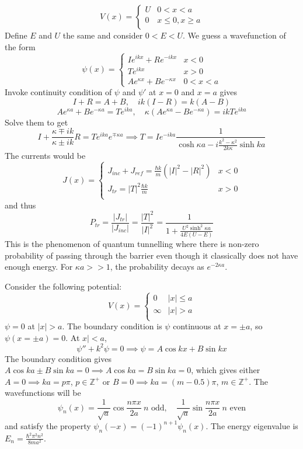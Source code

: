 \documentclass[a4paper]{article}
\begin{document}
\begin{eg}
   $$
V(x)=
\left\{
        \begin{array}{ll}
      U & 0<x<a\\
	0& x\leq 0,x\geq a\\
        \end{array}
    \right.
$$
Define $E$ and $U$ the same and consider $0<E<U$. We guess a wavefunction of the form
       $$
\psi(x)=
\left\{
        \begin{array}{ll}
      Ie^{ikx}+Re^{-ikx} & x<0\\
 Te^{ikx}& x>0\\
 Ae^{\kappa x}+Be^{-\kappa x}&0<x<a
        \end{array}
    \right.
$$
Invoke continuity condition of $\psi$ and $\psi'$ at $x=0$ and $x=a$ gives
$$I+R=A+B,\quad ik(I-R)=k(A-B)$$
$$Ae^{\kappa a}+Be^{-\kappa a}=Te^{ika},\quad \kappa (Ae^{\kappa a}-Be^{-\kappa a})=ikTe^{ika}$$
Solve them to get 
$$I+\frac{\kappa\mp ik}{\kappa\pm ik}R=Te^{ika}e^{\mp\kappa a}\implies T=Ie^{-ika}\frac{1}{\cosh\kappa a-i\frac{k^2-\kappa^2}{2k\kappa}\sinh ka}$$
The currents would be 
       $$
J(x)=
\left\{
        \begin{array}{ll}
      J_{inc}+J_{ref}=\frac{\hbar k}{m}(|I|^2-|R|^2)& x<0\\
J_{tr}=|T|^2\frac{\hbar k}{m}& x>0\\
        \end{array}
    \right.
$$
and thus 
$$P_{tr}=\frac{|J_{tr}|}{|J_{inc}|}=\frac{|T|^2}{|I|^2}=\frac{1}{1+\frac{U^2\sinh^2\kappa a}{4E(U-E)}}$$
This is the phenomenon of quantum tunnelling where there is non-zero probability of passing through the barrier even though it classically does not have enough energy. For $\kappa a>>1$, the probability decays as $e^{-2\kappa a}$.
\end{eg}
\begin{eg}
Consider the following potential:
    $$
V(x)=
\left\{
        \begin{array}{ll}
      0 & |x|\leq a \\
	\infty& |x|>a\\
        \end{array}
    \right.
$$
$\psi=0$ at $|x|>a$. The boundary condition is $\psi$ continuous at $x=\pm a$, so $\psi(x=\pm a)=0$. At $x|<a$, 
$$\psi''+k^2\psi=0\implies\psi=A\cos kx+B\sin kx$$
The boundary condition gives $A\cos ka\pm B\sin ka=0\implies A\cos ka=B\sin ka=0$, which gives either $A=0\implies ka=p\pi$, $p\in\mathbb{Z}^+$ or $B=0\implies ka=(m-0.5)\pi$, $m\in\mathbb{Z}^+$. The wavefunctions will be
$$\psi_n(x)=\frac{1}{\sqrt{a}}\cos\frac{n\pi x}{2a}~n\text{ odd},\quad\frac{1}{\sqrt{a}}\sin\frac{n\pi x}{2a}~n\text{ even}$$
and satisfy the property $\psi_n(-x)=(-1)^{n+1}\psi_n(x)$. The energy eigenvalue is $E_n=\frac{\hbar^2\pi^2n^2}{8ma^2}$.
\end{eg}
\end{document}
